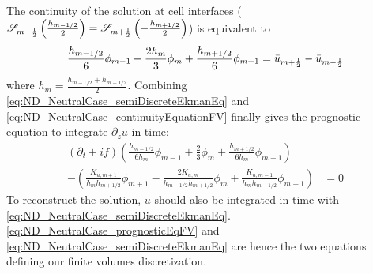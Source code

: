 The continuity of the solution at cell interfaces (${\cal S}_{m-\frac{1}{2}}\left(\frac{h_{m-1/2}}{2}\right) = {\cal S}_{m+\frac{1}{2}}\left(-\frac{h_{m+1/2}}{2}\right)$) is equivalent to
%
\begin{equation}
\label{eq:ND_NeutralCase_continuityEquationFV}
\frac{h_{m-1/2}}{6} \phi_{m-1} 
+ \frac{2h_{m}}{3} \phi_m  
+ \frac{h_{m+1/2}}{6} \phi_{m+1} = \Bar{u}_{m+\frac{1}{2}} - \Bar{u}_{m-\frac{1}{2}}
\end{equation}
where $h_m = \frac{h_{m-1/2} + h_{m+1/2}}{2}$.
Combining \eqref{eq:ND_NeutralCase_semiDiscreteEkmanEq}
and \eqref{eq:ND_NeutralCase_continuityEquationFV} finally gives
the prognostic equation to integrate
$\partial_z u$ in time:
\begin{equation}
\begin{aligned}
\label{eq:ND_NeutralCase_prognosticEqFV}
(\partial_t + if) \left( \frac{h_{m-1/2}}{6h_m} \phi_{m-1} 
+ \frac{2}{3} \phi_m  
+ \frac{h_{m+1/2}}{6h_m} \phi_{m+1} \right)& \\
-
    \left(
	\frac{K_{u, m+1}}{h_m h_{m+1/2}}\phi_{m+1} - \frac{2 K_{u,m}}{h_{m-1/2} h _{m+1/2}}\phi_m + \frac{K_{u,m-1}}{h_m h_{m-1/2}}\phi_{m-1}
    \right)
&= 0
\end{aligned}
\end{equation}
To reconstruct the solution, $\overline{u}$ should also be 
integrated in time with \eqref{eq:ND_NeutralCase_semiDiscreteEkmanEq}.
\eqref{eq:ND_NeutralCase_prognosticEqFV} and
\eqref{eq:ND_NeutralCase_semiDiscreteEkmanEq} are hence the two 
equations defining our finite volumes discretization.

